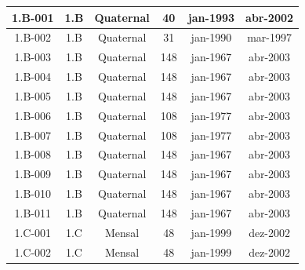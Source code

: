 \begin{center}
\begin{xtabular}{c|c|c|c|c|c}
    {\scriptsize 1.B-001} & {\scriptsize 1.B}   & {\scriptsize Quaternal} & {\scriptsize 40}   & {\scriptsize jan-1993} & {\scriptsize abr-2002} \\ \hline
    {\scriptsize 1.B-002} & {\scriptsize 1.B}   & {\scriptsize Quaternal} & {\scriptsize 31}   & {\scriptsize jan-1990} & {\scriptsize mar-1997} \\ \hline
    {\scriptsize 1.B-003} & {\scriptsize 1.B}   & {\scriptsize Quaternal} & {\scriptsize 148}   & {\scriptsize jan-1967} & {\scriptsize abr-2003}\\ \hline
    {\scriptsize 1.B-004} & {\scriptsize 1.B}   & {\scriptsize Quaternal} & {\scriptsize 148}   & {\scriptsize jan-1967} & {\scriptsize abr-2003} \\ \hline
    {\scriptsize 1.B-005} & {\scriptsize 1.B}   & {\scriptsize Quaternal} & {\scriptsize 148}   & {\scriptsize jan-1967} & {\scriptsize abr-2003} \\ \hline
    {\scriptsize 1.B-006} & {\scriptsize 1.B}   & {\scriptsize Quaternal} & {\scriptsize 108}   & {\scriptsize jan-1977} & {\scriptsize abr-2003} \\ \hline
    {\scriptsize 1.B-007} & {\scriptsize 1.B}   & {\scriptsize Quaternal} & {\scriptsize 108}   & {\scriptsize jan-1977} & {\scriptsize abr-2003} \\ \hline
    {\scriptsize 1.B-008} & {\scriptsize 1.B}   & {\scriptsize Quaternal} & {\scriptsize 148}   & {\scriptsize jan-1967} & {\scriptsize abr-2003} \\ \hline
    {\scriptsize 1.B-009} & {\scriptsize 1.B}   & {\scriptsize Quaternal} & {\scriptsize 148}   & {\scriptsize jan-1967} & {\scriptsize abr-2003} \\ \hline
    {\scriptsize 1.B-010} & {\scriptsize 1.B}   & {\scriptsize Quaternal} & {\scriptsize 148}   & {\scriptsize jan-1967} & {\scriptsize abr-2003} \\ \hline
    {\scriptsize 1.B-011} & {\scriptsize 1.B}   & {\scriptsize Quaternal} & {\scriptsize 148}   & {\scriptsize jan-1967} & {\scriptsize abr-2003} \\ \hline
    {\scriptsize 1.C-001} & {\scriptsize 1.C}   & {\scriptsize Mensal} & {\scriptsize 48 }   & {\scriptsize jan-1999} & {\scriptsize dez-2002} \\ \hline
    {\scriptsize 1.C-002} & {\scriptsize 1.C}   & {\scriptsize Mensal} & {\scriptsize 48 }   & {\scriptsize jan-1999} & {\scriptsize dez-2002} \\ \hline

\end{xtabular}
\end{center}
